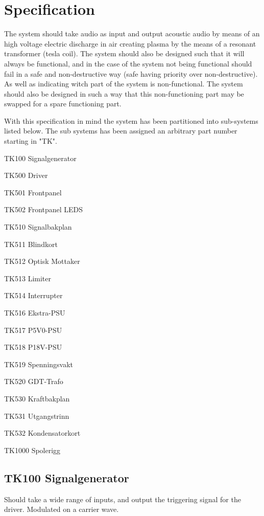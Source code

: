 \section{Specification}
The system should take audio as input and output acoustic audio by means of an high voltage electric discharge in air creating plasma by the means of a resonant transformer (tesla coil). The system should also be designed such that it will always be functional, and in the case of the system not being functional should fail in a safe and non-destructive way (safe having priority over non-destructive). As well as indicating witch part of the system is non-functional. The system should also be designed in such a way that this non-functioning part may be swapped for a spare functioning part.

With this specification in mind the system has been partitioned into sub-systems listed below. The sub systems has been assigned an arbitrary part number starting in "TK".

\begin{list}
    \item TK100 Signalgenerator
    \item TK500 Driver
    \begin{list}
        \item TK501 Frontpanel
        \item TK502 Frontpanel LEDS
        \item TK510 Signalbakplan
        \item TK511 Blindkort
        \item TK512 Optisk Mottaker
        \item TK513 Limiter
        \item TK514 Interrupter
        \item TK516 Ekstra-PSU
        \item TK517 P5V0-PSU
        \item TK518 P18V-PSU
        \item TK519 Spenningsvakt
        \item TK520 GDT-Trafo
        \item TK530 Kraftbakplan
        \item TK531 Utgangstrinn
        \item TK532 Kondensatorkort
    \end{list}
    \item TK1000 Spolerigg
\end{list}

\subsection{TK100 Signalgenerator}
Should take a wide range of inputs, and output the triggering signal for the driver. Modulated on a carrier wave.
